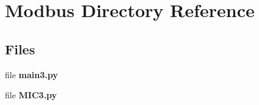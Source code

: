 \section{Modbus Directory Reference}
\label{dir_b853837f43ac0d6647f85faca227887b}
\subsection*{Files}
\begin{DoxyCompactItemize}
\item 
file \textbf{ main3.\+py}
\item 
file \textbf{ M\+I\+C3.\+py}
\end{DoxyCompactItemize}
